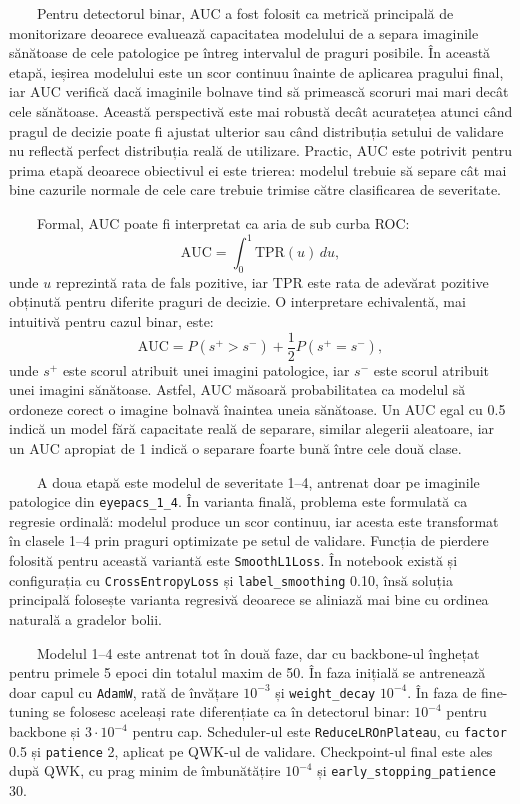 \documentclass[12pt, a4paper, twoside, romanian]{teza-upb}
\begin{document}
\ \ \ \ Pentru detectorul binar, AUC a fost folosit ca metrică principală de monitorizare deoarece
evaluează capacitatea modelului de a separa imaginile sănătoase de cele patologice pe întreg intervalul
de praguri posibile. În această etapă, ieșirea modelului este un scor continuu înainte de aplicarea
pragului final, iar AUC verifică dacă imaginile bolnave tind să primească scoruri mai mari decât cele
sănătoase. Această perspectivă este mai robustă decât acuratețea atunci când pragul de decizie poate fi
ajustat ulterior sau când distribuția setului de validare nu reflectă perfect distribuția reală de
utilizare. Practic, AUC este potrivit pentru prima etapă deoarece obiectivul ei este trierea: modelul
trebuie să separe cât mai bine cazurile normale de cele care trebuie trimise către clasificarea de
severitate. 
\bigskip 

\ \ \ \ Formal, AUC poate fi interpretat ca aria de sub curba ROC:
\[
\mathrm{AUC} = \int_{0}^{1} \mathrm{TPR}(u)\,du,
\]
unde \(u\) reprezintă rata de fals pozitive, iar \(\mathrm{TPR}\) este rata de adevărat pozitive
obținută pentru diferite praguri de decizie. O interpretare echivalentă, mai intuitivă pentru cazul
binar, este:
\[
\mathrm{AUC} = P(s^+ > s^-) + \frac{1}{2}P(s^+ = s^-),
\]
unde \(s^+\) este scorul atribuit unei imagini patologice, iar \(s^-\) este scorul atribuit unei
imagini sănătoase. Astfel, AUC măsoară probabilitatea ca modelul să ordoneze corect o imagine bolnavă
înaintea uneia sănătoase. Un AUC egal cu 0.5 indică un model fără capacitate reală de separare, similar
alegerii aleatoare, iar un AUC apropiat de 1 indică o separare foarte bună între cele două clase.
\bigskip

\ \ \ \ A doua etapă este modelul de severitate 1--4, antrenat doar pe imaginile patologice din
\texttt{eyepacs\_1\_4}. În varianta finală, problema este formulată ca regresie ordinală: modelul
produce un scor continuu, iar acesta este transformat în clasele 1--4 prin praguri optimizate pe setul
de validare. Funcția de pierdere folosită pentru această variantă este \texttt{SmoothL1Loss}. În
notebook există și configurația cu \texttt{CrossEntropyLoss} și \texttt{label\_smoothing} 0.10, însă
soluția principală folosește varianta regresivă deoarece se aliniază mai bine cu ordinea naturală a
gradelor bolii.
\bigskip

\ \ \ \ Modelul 1--4 este antrenat tot în două faze, dar cu backbone-ul înghețat pentru primele 5
epoci din totalul maxim de 50. În faza inițială se antrenează doar capul cu \texttt{AdamW}, rată de
învățare \(10^{-3}\) și \texttt{weight\_decay} \(10^{-4}\). În faza de fine-tuning se folosesc aceleași
rate diferențiate ca în detectorul binar: \(10^{-4}\) pentru backbone și \(3 \cdot 10^{-4}\) pentru
cap. Scheduler-ul este \texttt{ReduceLROnPlateau}, cu \texttt{factor} 0.5 și \texttt{patience} 2,
aplicat pe QWK-ul de validare. Checkpoint-ul final este ales după QWK, cu prag minim de îmbunătățire
\(10^{-4}\) și \texttt{early\_stopping\_patience} 30.
\bigskip
\end{document}
